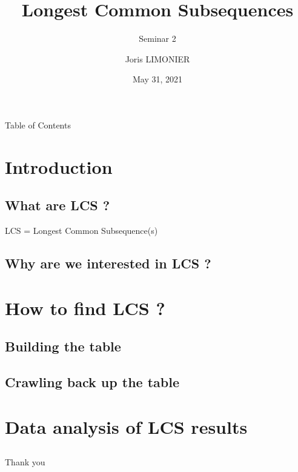 \documentclass{beamer}
\title{Longest Common Subsequences}
\subtitle{Seminar 2}
\author{Joris LIMONIER}
\institute{University of Luxembourg}
\date{May 31, 2021}
\begin{document}
\maketitle

\begin{frame}{Table of Contents}
    \tableofcontents
\end{frame}


\section{Introduction}
\subsection{What are LCS ?}
\begin{frame}
    LCS = Longest Common Subsequence(s)
\end{frame}

\subsection{Why are we interested in LCS ?}

\begin{frame}
\end{frame}

\section{How to find LCS ?}
\subsection{Building the table}
\begin{frame}
\end{frame}

\subsection{Crawling back up the table}
\begin{frame}
\end{frame}

\section{Data analysis of LCS results}
\subsection{}
\begin{frame}
\end{frame}

\begin{frame}[standout]
    Thank you
\end{frame}
\end{document}
